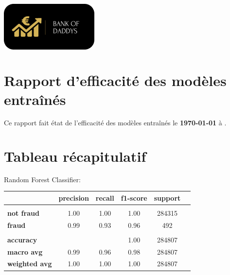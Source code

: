\documentclass[10pt,a4paper]{article}
\begin{document}
\begin{center}
\includegraphics[scale=1]{views/img/background_splash} 
\end{center}
\section{Rapport d'efficacité des modèles entraînés }
\flushleft
\bigbreak  
\bigbreak  
Ce rapport fait état de l'efficacité des modèles entraînés le \textbf {\today{}}  à  \textbf {\DTMcurrenttime{}}.
\bigbreak  
\section{Tableau récapitulatif}
\flushleft
\bigbreak  
\bigbreak  
\large{ Random Forest Classifier:}
\flushleft
\bigbreak  
\normalsize
\begin{center}
\begin{tabular}{ l | c  c  c  c  c  }
 & \textbf{precision} & \textbf {recall} & \textbf {f1-score} & \textbf {support}\\
\hline
& & & &\\
\textbf {not fraud} & 1.00 & 1.00 & 1.00 & 284315 \\
\textbf {fraud} & 0.99 & 0.93 & 0.96 & 492\\
& & & &\\
\textbf {accuracy} &  & & 1.00 & 284807\\
\textbf {macro avg} & 0.99 & 0.96 & 0.98 & 284807\\
\textbf {weighted avg} & 1.00 & 1.00 & 1.00 & 284807\\
\end{tabular}
\end{center}
\end{document}
